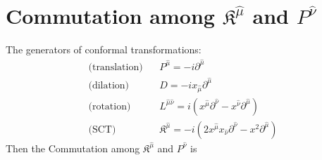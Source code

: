 \documentclass[]{article}
\numberwithin{equation}{section}
\begin{document}
\section{Commutation among $\mathfrak{K}^{\hat{\mu}}$ and $P^{\hat{\nu}}$}
The generators of conformal transformations:
\begin{align}
    \text{(translation)}~~~~&P^{\hat{\mu}}=-i\partial^{\hat{\mu}}\\
    \text{(dilation)}~~~~&D=-ix_{\hat{\mu}}\partial^{\hat{\mu}}\\
    \text{(rotation)}~~~~&L^{\hat{\mu}\hat{\nu}}=i\left(x^{\hat{\mu}}\partial^{\hat{\nu}}-x^{\hat{\nu}}\partial^{\hat{\mu}}\right)\\
    \text{(SCT)}~~~~&\mathfrak{K}^{\hat{\mu}}=-i\left(2x^{\hat{\mu}}x_{\hat{\nu}}\partial^{\hat{\nu}}-x^2\partial^{\hat{\mu}}\right)
\end{align}
Then the Commutation among $\mathfrak{K}^{\hat{\mu}}$ and $P^{\hat{\nu}}$ is
\end{document}
